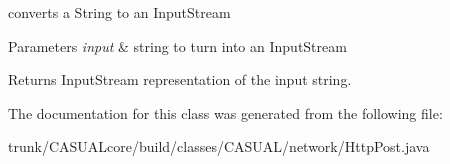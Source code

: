 converts a String to an Input\-Stream 
\begin{DoxyParams}{Parameters}
{\em input} & string to turn into an Input\-Stream \\
\hline
\end{DoxyParams}
\begin{DoxyReturn}{Returns}
Input\-Stream representation of the input string. 
\end{DoxyReturn}


The documentation for this class was generated from the following file\-:\begin{DoxyCompactItemize}
\item 
trunk/\-C\-A\-S\-U\-A\-Lcore/build/classes/\-C\-A\-S\-U\-A\-L/network/Http\-Post.\-java\end{DoxyCompactItemize}
